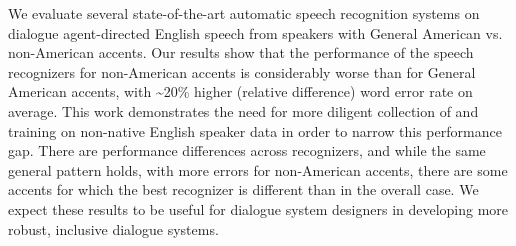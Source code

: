 We evaluate several state-of-the-art automatic speech recognition systems on dialogue agent-directed English speech from speakers with General American vs. non-American accents. Our results show that the performance of the speech recognizers for non-American accents is considerably worse than for General American accents, with {\textasciitilde}20\% higher (relative difference) word error rate on average. This work demonstrates the need for more diligent collection of and training on non-native English speaker data in order to narrow this performance gap. There are performance differences across recognizers, and while the same general pattern holds, with more errors for non-American accents, there are some accents for which the best recognizer is different than in the overall case. We expect these results to be useful for dialogue system designers in developing more robust, inclusive dialogue systems.
